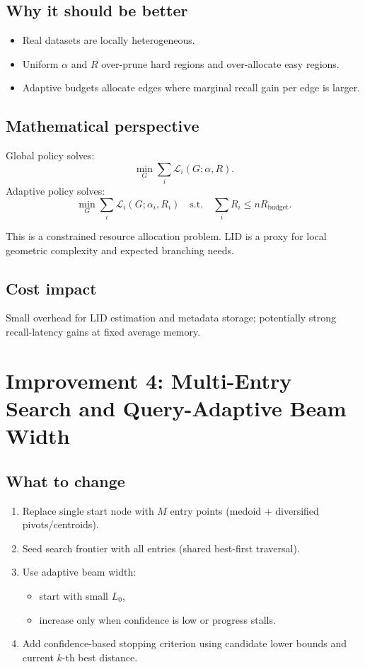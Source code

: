 \documentclass[11pt]{article}
\begin{document}
\subsection{Why it should be better}
\begin{itemize}[leftmargin=*]
    \item Real datasets are locally heterogeneous.
    \item Uniform $\alpha$ and $R$ over-prune hard regions and over-allocate easy regions.
    \item Adaptive budgets allocate edges where marginal recall gain per edge is larger.
\end{itemize}

\subsection{Mathematical perspective}
Global policy solves:
\begin{equation}
\min_G \sum_i \mathcal{L}_i(G;\alpha,R).
\end{equation}
Adaptive policy solves:
\begin{equation}
\min_G \sum_i \mathcal{L}_i(G;\alpha_i,R_i)
\quad\text{s.t.}\quad
\sum_i R_i \le nR_{\text{budget}}.
\end{equation}

This is a constrained resource allocation problem. LID is a proxy for local geometric complexity and expected branching needs.

\subsection{Cost impact}
Small overhead for LID estimation and metadata storage; potentially strong recall-latency gains at fixed average memory.

\section{Improvement 4: Multi-Entry Search and Query-Adaptive Beam Width}

\subsection{What to change}
\begin{enumerate}[leftmargin=*]
    \item Replace single start node with $M$ entry points (medoid + diversified pivots/centroids).
    \item Seed search frontier with all entries (shared best-first traversal).
    \item Use adaptive beam width:
    \begin{itemize}[leftmargin=*]
        \item start with small $L_0$,
        \item increase only when confidence is low or progress stalls.
    \end{itemize}
    \item Add confidence-based stopping criterion using candidate lower bounds and current $k$-th best distance.
\end{enumerate}
\end{document}
